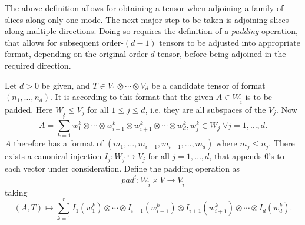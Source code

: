 \documentclass[../Lael_John_MasterThesis_Draft.tex]{subfiles}
\begin{document}
The above definition allows for obtaining a tensor when adjoining a family of slices along only one mode. The next major step to be taken is adjoining slices along multiple directions. Doing so requires the definition of a \textit{padding} operation, that allows for subsequent order-$(d-1)$ tensors to be adjusted into appropriate format, depending on the original order-$d$ tensor, before being adjoined in the required direction.
\begin{definition}\label{defn:lowerorderpadding}
    
    Let $d > 0$ be given, and $T \in V_1 \otimes \cdots \otimes V_d$ be a candidate tensor of format $(n_1, \ldots, n_d)$. It is according to this format that the given $A \in W_{\hat{i}}$ is to be padded. Here $W_j \leq V_j$ for all $1 \leq j \leq d$, i.e. they are all subspaces of the $V_j$. Now
    $$A = \sum_{k=1}^{r} w_1^k \otimes \cdots \otimes w_{i-1}^k \otimes w_{i+1}^k \otimes \cdots \otimes w_d^k, w_j^k \in W_j \; \forall j = 1, \ldots, d.$$
    $A$ therefore has a format of $(m_1, \ldots, m_{i-1}, m_{i+1}, \ldots, m_d)$ where $m_j \leq n_j.$ There exists a canonical injection $I_j: W_j \hookrightarrow V_j$ for all $j = 1, \ldots, d$, that appends $0$'s to each vector under consideration. Define the padding operation as $$pad^i : W_{\hat{i}} \times V \to V_{\hat{i}}$$ taking $$(A, T) \mapsto \sum_{k=1}^{r} I_1(w_1^k) \otimes \cdots \otimes I_{i-1}(w_{i-1}^k) \otimes I_{i+1}(w_{i+1}^k) \otimes \cdots \otimes I_d(w_d^k).$$ 
\end{definition}
\end{document}
